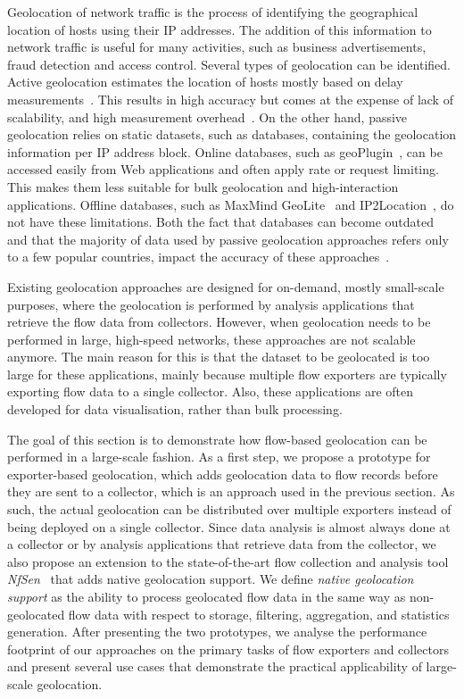 Geolocation of network traffic is the process of identifying the geographical location of hosts using their IP addresses. The addition of this information to network traffic is useful for many activities, such as business advertisements, fraud detection and access control. Several types of geolocation can be identified. Active geolocation estimates the location of hosts mostly based on delay measurements~\cite{Katz-Bassett-2006-Towards, Eriksson-2010-Learning}. This results in high accuracy but comes at the expense of lack of scalability, and high measurement overhead~\cite{Poese-2011-IP}. On the other hand, passive geolocation relies on static datasets, such as databases, containing the geolocation information per IP address block. Online databases, such as geoPlugin~\cite{--geoPlugin}, can be accessed easily from Web applications and often apply rate or request limiting. This makes them less suitable for bulk geolocation and high-interaction applications. Offline databases, such as MaxMind GeoLite~\cite{MaxMind--GeoLite} and IP2Location~\cite{IP2Location--IP}, do not have these limitations. Both the fact that databases can become outdated and that the majority of data used by passive geolocation approaches refers only to a few popular countries, impact the accuracy of these approaches~\cite{Poese-2011-IP}.
 
Existing geolocation approaches are designed for on-demand, mostly small-scale purposes, where the geolocation is performed by analysis applications that retrieve the flow data from collectors. However, when geolocation needs to be performed in large, high-speed networks, these approaches are not scalable anymore. The main reason for this is that the dataset to be geolocated is too large for these applications, mainly because multiple flow exporters are typically exporting flow data to a single collector. Also, these applications are often developed for data visualisation, rather than bulk processing.

The goal of this section is to demonstrate how flow-based geolocation can be performed in a large-scale fashion. As a first step, we propose a prototype for exporter-based geolocation, which adds geolocation data to flow records before they are sent to a collector, which is an approach used in the previous section. As such, the actual geolocation can be distributed over multiple exporters instead of being deployed on a single collector. Since data analysis is almost always done at a collector or by analysis applications that retrieve data from the collector, we also propose an extension to the state-of-the-art flow collection and analysis tool \textit{NfSen}~\cite{Haag-2011-NfSen} that adds native geolocation support. We define \textit{native geolocation support} as the ability to process geolocated flow data in the same way as non-geolocated flow data with respect to storage, filtering, aggregation, and statistics generation. After presenting the two prototypes, we analyse the performance footprint of our approaches on the primary tasks of flow exporters and collectors and present several use cases that demonstrate the practical applicability of large-scale geolocation.

